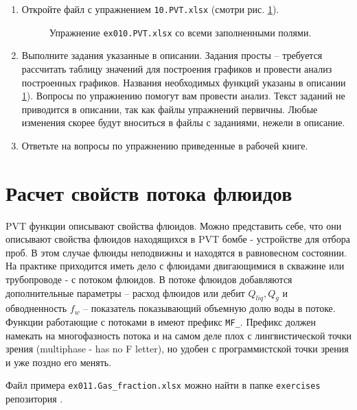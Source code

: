 \begin{enumerate}

	\item Откройте файл с упражнением \texttt{10.PVT.xlsx} (смотри рис. \ref{ris:Ex10_1}).
	
	\begin{figure}[h!]
		\center{\texttt{[image: Ex10\_1]}}
		\caption{Упражнение \texttt{ex010.PVT.xlsx} со всеми заполненными полями.}
		\label{ris:Ex10_1}
	\end{figure}
	
	\item Выполните задания указанные в описании. Задания просты -- требуется рассчитать таблицу значений для построения графиков и провести анализ построенных графиков. Названия необходимых функций указаны в описании  \ref{ris:Ex10_1}). Вопросы по упражнению помогут вам провести анализ. Текст заданий не приводится в описании, так как файлы упражнений первичны. Любые изменения скорее будут вноситься в файлы с заданиями, нежели в описание.
	
	\item Ответьте на вопросы по упражнению приведенные в рабочей книге.
	 
\end{enumerate}

\section{Расчет свойств потока флюидов}

PVT функции описывают свойства флюидов. Можно представить себе, что они описывают свойства флюидов находящихся в PVT бомбе - устройстве для отбора проб. В этом случае флюиды неподвижны и находятся в равновесном состоянии. На практике приходится иметь дело с флюидами двигающимися в скважине или трубопроводе - с потоком флюидов. В потоке флюидов добавляются дополнительные параметры -- расход флюидов или дебит $Q_{liq}, Q_g$ и обводненность $f_w$ -- показатель показывающий объемную долю воды в потоке. 
Функции работающие с потоками в \unf{} имеют префикс \texttt{MF_}. Префикс должен намекать на многофазность потока и на самом деле плох с лингвистической точки зрения (multiphase - has no F letter), но удобен с программистской точки зрения и уже поздно его менять.

Файл примера \texttt{ex011.Gas_fraction.xlsx} можно найти в папке \texttt{exercises} репозитория \unf{}.

